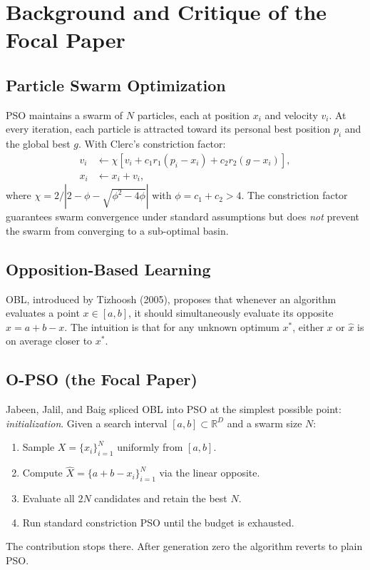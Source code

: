 \documentclass[11pt,a4paper]{article}
\begin{document}
\section{Background and Critique of the Focal Paper}

\subsection{Particle Swarm Optimization}

PSO maintains a swarm of $N$ particles, each at position $x_i$ and velocity
$v_i$. At every iteration, each particle is attracted toward its personal
best position $p_i$ and the global best $g$. With Clerc's constriction
factor:
\begin{align*}
v_i &\leftarrow \chi\!\left[v_i + c_1 r_1 (p_i - x_i) + c_2 r_2 (g - x_i)\right],\\
x_i &\leftarrow x_i + v_i,
\end{align*}
where $\chi = 2/|2-\phi-\sqrt{\phi^2-4\phi}|$ with $\phi = c_1+c_2 > 4$.
The constriction factor guarantees swarm convergence under standard
assumptions but does \emph{not} prevent the swarm from converging to a
sub-optimal basin.

\subsection{Opposition-Based Learning}

OBL, introduced by Tizhoosh (2005), proposes that whenever an algorithm
evaluates a point $x \in [a,b]$, it should simultaneously evaluate its
opposite $\hat{x} = a + b - x$. The intuition is that for any unknown
optimum $x^{*}$, either $x$ or $\hat{x}$ is on average closer to $x^{*}$.

\subsection{O-PSO (the Focal Paper)}

Jabeen, Jalil, and Baig spliced OBL into PSO at the simplest possible
point: \emph{initialization}. Given a search interval $[a,b]\subset
\mathbb{R}^{D}$ and a swarm size $N$:
\begin{enumerate}
  \item Sample $X = \{x_i\}_{i=1}^{N}$ uniformly from $[a,b]$.
  \item Compute $\hat{X} = \{a+b-x_i\}_{i=1}^{N}$ via the linear opposite.
  \item Evaluate all $2N$ candidates and retain the best $N$.
  \item Run standard constriction PSO until the budget is exhausted.
\end{enumerate}
The contribution stops there. After generation zero the algorithm reverts
to plain PSO.
\end{document}
